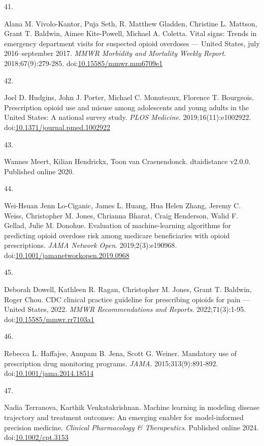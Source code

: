 \documentclass[
  12pt,
]{book}
\newlength{\cslhangindent}
\newlength{\csllabelwidth}
\newenvironment{CSLReferences}[2] %
 {\begin{list}{}{%
  \setlength{\itemindent}{0pt}
  \setlength{\leftmargin}{0pt}
  \setlength{\parsep}{0pt}
  \ifodd #1
   \setlength{\leftmargin}{\cslhangindent}
   \setlength{\itemindent}{-1\cslhangindent}
  \fi
  \setlength{\itemsep}{#2\baselineskip}}}
 {\end{list}}
\newcommand{\CSLLeftMargin}[1]{\parbox[t]{\csllabelwidth}{\strut#1\strut}}
\newcommand{\CSLRightInline}[1]{\parbox[t]{\linewidth - \csllabelwidth}{\strut#1\strut}}
\begin{document}
\begin{CSLReferences}{0}{1}
\CSLLeftMargin{41. }%
\CSLRightInline{Alana M. Vivolo-Kantor, Puja Seth, R. Matthew Gladden,
Christine L. Mattson, Grant T. Baldwin, Aimee Kite-Powell, Michael A.
Coletta. Vital signs: Trends in emergency department visits for
suspected opioid overdoses --- {United States}, july 2016--september
2017. \emph{MMWR Morbidity and Mortality Weekly Report}.
2018;67(9):279-285.
doi:\href{https://doi.org/10.15585/mmwr.mm6709e1}{10.15585/mmwr.mm6709e1}}

\CSLLeftMargin{42. }%
\CSLRightInline{Joel D. Hudgins, John J. Porter, Michael C. Monuteaux,
Florence T. Bourgeois. Prescription opioid use and misuse among
adolescents and young adults in the {United States}: A national survey
study. \emph{PLOS Medicine}. 2019;16(11):e1002922.
doi:\href{https://doi.org/10.1371/journal.pmed.1002922}{10.1371/journal.pmed.1002922}}

\CSLLeftMargin{43. }%
\CSLRightInline{Wannes Meert, Kilian Hendrickx, Toon van Craenendonck.
{dtaidistance} v2.0.0. Published online 2020.}

\CSLLeftMargin{44. }%
\CSLRightInline{Wei-Hsuan Jenn Lo-Ciganic, James L. Huang, Hua Helen
Zhang, Jeremy C. Weiss, Christopher M. Jones, Chrianna Bharat, Craig
Henderson, Walid F. Gellad, Julie M. Donohue. Evaluation of
machine-learning algorithms for predicting opioid overdose risk among
medicare beneficiaries with opioid prescriptions. \emph{JAMA Network
Open}. 2019;2(3):e190968.
doi:\href{https://doi.org/10.1001/jamanetworkopen.2019.0968}{10.1001/jamanetworkopen.2019.0968}}

\CSLLeftMargin{45. }%
\CSLRightInline{Deborah Dowell, Kathleen R. Ragan, Christopher M. Jones,
Grant T. Baldwin, Roger Chou. {CDC} clinical practice guideline for
prescribing opioids for pain --- {United States}, 2022. \emph{MMWR
Recommendations and Reports}. 2022;71(3):1-95.
doi:\href{https://doi.org/10.15585/mmwr.rr7103a1}{10.15585/mmwr.rr7103a1}}

\CSLLeftMargin{46. }%
\CSLRightInline{Rebecca L. Haffajee, Anupam B. Jena, Scott G. Weiner.
Mandatory use of prescription drug monitoring programs. \emph{JAMA}.
2015;313(9):891-892.
doi:\href{https://doi.org/10.1001/jama.2014.18514}{10.1001/jama.2014.18514}}

\CSLLeftMargin{47. }%
\CSLRightInline{Nadia Terranova, Karthik Venkatakrishnan. Machine
learning in modeling disease trajectory and treatment outcomes: An
emerging enabler for model-informed precision medicine. \emph{Clinical
Pharmacology \& Therapeutics}. Published online 2024.
doi:\href{https://doi.org/10.1002/cpt.3153}{10.1002/cpt.3153}}


\end{CSLReferences}
\end{document}
